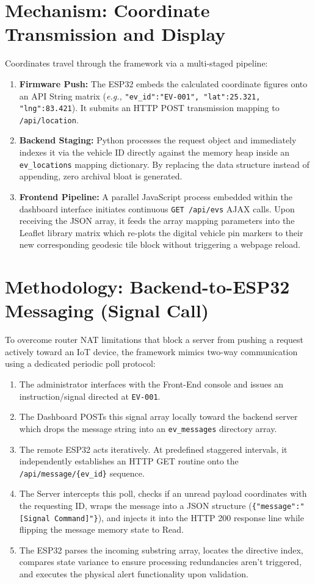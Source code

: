 \documentclass[a4paper,12pt]{article}
\begin{document}
\section{Mechanism: Coordinate Transmission and Display}
Coordinates travel through the framework via a multi-staged pipeline:
\begin{enumerate}
    \item \textbf{Firmware Push:} The ESP32 embeds the calculated coordinate figures onto an API String matrix (\textit{e.g.,} \texttt{{"ev\_id":"EV-001", "lat":25.321, "lng":83.421}}). It submits an HTTP POST transmission mapping to \texttt{/api/location}.
    \item \textbf{Backend Staging:} Python processes the request object and immediately indexes it via the vehicle ID directly against the memory heap inside an \texttt{ev\_locations} mapping dictionary. By replacing the data structure instead of appending, zero archival bloat is generated.
    \item \textbf{Frontend Pipeline:} A parallel JavaScript process embedded within the dashboard interface initiates continuous \texttt{GET /api/evs} AJAX calls. Upon receiving the JSON array, it feeds the array mapping parameters into the Leaflet library matrix which re-plots the digital vehicle pin markers to their new corresponding geodesic tile block without triggering a webpage reload.
\end{enumerate}

\section{Methodology: Backend-to-ESP32 Messaging (Signal Call)}
To overcome router NAT limitations that block a server from pushing a request actively toward an IoT device, the framework mimics two-way communication using a dedicated periodic poll protocol:
\begin{enumerate}
    \item The administrator interfaces with the Front-End console and issues an instruction/signal directed at \texttt{EV-001}. 
    \item The Dashboard POSTs this signal array locally toward the backend server which drops the message string into an \texttt{ev\_messages} directory array.
    \item The remote ESP32 acts iteratively. At predefined staggered intervals, it independently establishes an HTTP GET routine onto the \texttt{/api/message/\{ev\_id\}} sequence.
    \item The Server intercepts this poll, checks if an unread payload coordinates with the requesting ID, wraps the message into a JSON structure (\texttt{\{"message":"[Signal Command]"\}}), and injects it into the HTTP 200 response line while flipping the message memory state to Read.
    \item The ESP32 parses the incoming substring array, locates the directive index, compares state variance to ensure processing redundancies aren't triggered, and executes the physical alert functionality upon validation.
\end{enumerate}
\end{document}
